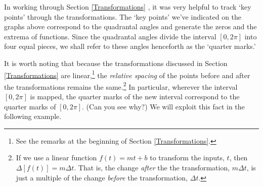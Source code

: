 \documentclass{ximera}
\begin{document}
In working through Section \ref{Transformations} , it was very helpful to track `key points' through  the transformations.  The `key points' we've indicated on the graphs above correspond to the quadrantal angles and generate the zeros and the extrema of functions. Since the quadrantal angles divide the interval $[0,2\pi]$ into four equal pieces, we shall refer to these angles henceforth  as the  `quarter marks.'    

\smallskip

It is worth noting that because the transformations discussed in Section \ref{Transformations} are linear,\footnote{See the remarks at the beginning of Section \ref{Transformations}.}  the \textit{relative spacing} of the points before and after the transformations remains the same.\footnote{If we use a linear function $f(t) = mt + b$ to transform the inputs, $t$, then  $\Delta[f(t)] = m \Delta t$.  That is, the change \textit{after} the the transformation, $m \Delta t$, is just a multiple of the change \textit{before} the transformation, $\Delta t$.}  In particular, wherever the interval $[0, 2\pi]$ is mapped, the quarter marks of the new interval correspond to the quarter marks of $[0, 2\pi]$.  (Can you see why?) We will exploit this fact in the following example.
\end{document}
